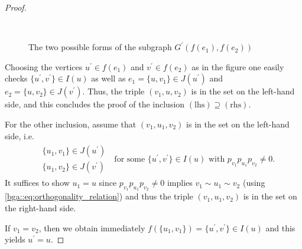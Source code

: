 \documentclass[a4paper]{amsart}
\begin{document}
\begin{proof}
\begin{figure}[htb]
\begin{tikzpicture}
        \end{tikzpicture}
        $\quad$
        \caption{The two possible forms of the subgraph $G^\prime(f(e_1), f(e_2))$}
        \label{class::fig:G(f(e_1), f(e_2))}
    \end{figure} 
    Choosing the vertices $u^\prime \in f(e_1)$ and $v^\prime \in f(e_2)$ as in the figure one easily checks $\{u^\prime, v^\prime\} \in I(u)$ as well as $e_1 = \{u, v_1\} \in J(u^\prime)$ and $e_2 = \{u, v_2\} \in J(v^\prime)$. Thus, the triple $(v_1, u, v_2)$ is in the set on the left-hand side, and this concludes the proof of the inclusion $(\mathrm{lhs}) \supseteq (\mathrm{rhs})$. 

    For the other inclusion, assume that $(v_1, u_1, v_2)$ is in the set on the left-hand side, i.e.
    \begin{align*}
            \begin{aligned}
                &\{u_1, v_1\} \in J(u^\prime) \\
                &\{u_1, v_2\} \in J(v^\prime)
            \end{aligned} \;
                \text{ for some } \{u^\prime, v^\prime\} \in I(u)
                \text{ with } p_{v_1} p_{u_1} p_{v_2} \neq 0.
    \end{align*}
    It suffices to show $u_1 = u$ since $p_{v_1} p_{u_1} p_{v_2} \neq 0$ implies $v_1 \sim u_1 \sim v_2$ (using \eqref{bga::eq:orthogonality_relation}) and thus the triple $(v_1, u_1, v_2)$ is in the set on the right-hand side.

    If $v_1 = v_2$, then we obtain immediately $f(\{u_1, v_1\}) = \{u^\prime, v^\prime\} \in I(u)$ and this yields $u^\prime = u$. 


\end{proof}
\end{document}
